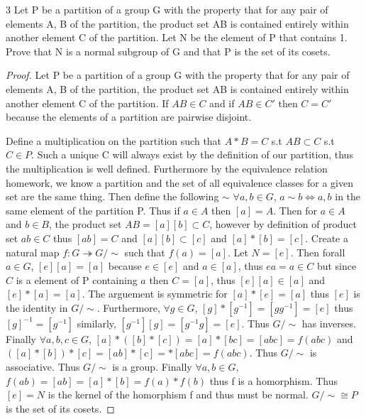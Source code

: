 \documentclass{article}
\begin{document}
\bigskip

\begin{claim}{3}
    Let P be a partition of a group G with the property that for any pair of elements A, B of the partition, the product set AB is contained entirely within another element C of the partition. Let N be the element of P that contains 1. Prove that N is a normal subgroup of G and that P is the set of its cosets.
\end{claim}
\begin{proof}
    Let P be a partition of a group G with the property that for any pair of elements A, B of the partition, the product set AB is contained entirely within another element C of the partition. If $AB \in C$ and if $AB \in C'$ then $C = C'$ because the elements of a partition are pairwise disjoint.

    Define a multiplication on the partition such that $A \ast B = C$ s.t $AB \subset C$ s.t $C \in P$. Such a unique C will always exist by the definition of our partition, thus the multiplication is well defined. Furthermore by the equivalence relation homework, we know a partition and the set of all equivalence classes for a given set are the same thing. Then define the following $\sim$ $\forall a, b \in G$, $a \sim b \iff a,b $ in the same element of the partition P. Thus if $a \in A$ then $[a] = A$. Then for $a \in A$ and $b \in B$, the product set $AB = [a][b] \subset C$, however by definition of product set $ab \in C$ thus $[ab] = C$ and $[a][b] \subset [c]$ and $[a] \ast [b] = [c]$. Create a natural map $f: G \twoheadrightarrow G/\sim $ such that $f(a) = [a]$. Let $N = [e]$. Then forall $a \in G$, $[e][a] = [a]$ because $e \in [e]$ and $a \in [a]$, thus $ea = a \in C$ but since $C$ is a element of P containing $a$ then $C = [a]$, thus $[e][a] \in [a]$ and $[e] \ast [a] = [a]$. The arguement is symmetric for $[a] \ast [e] = [a]$ thus $[e]$ is the identity in $G/\sim$. Furthermore, $\forall g \in G$, $[g] \ast [g^{-1}] = [gg^{-1}] = [e]$ thus $[g]^{-1} = [g^{-1}]$ similarly, $[g^{-1}][g] = [g^{-1}g] = [e]$. Thus $G/\sim$ has inverses. Finally $\forall a, b, c \in G$, $[a] \ast ([b] \ast [c]) = [a] \ast [bc] = [abc] = f(abc)$ and $([a] \ast [b]) \ast [c] = [ab] \ast [c] = \ast[abc] = f(abc)$. Thus $G/\sim$ is associative. Thus $G/\sim$ is a group. Finally $\forall a, b \in G$, $f(ab) = [ab] = [a] \ast [b] = f(a)\ast f(b)$ thus f is a homorphism. Thus $[e] = N$ is the kernel of the homorphism f and thus must be normal. $G/\sim \cong P$ is the set of its cosets.

\end{proof}
\end{document}
